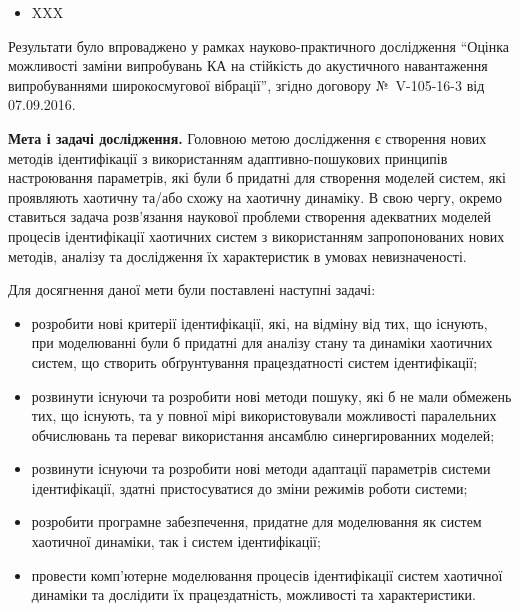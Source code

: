\documentclass[a4paper,12pt]{atuaref}
\begin{document}
\begin{itemize}

\item XXX

\end{itemize}

Результати було впроваджено у рамках науково-практичного дослідження
``Оцінка    можливості заміни випробувань КА на стійкість до акустичного навантаження
випробуваннями широкосмугової вібрації'', згідно договору №~V-105-16-3 від 07.09.2016.

\textbf{Мета і задачі дослідження.}
Головною метою дослідження є створення нових методів ідентифікації з
використанням адаптивно-пошукових принципів настроювання параметрів, які
були б придатні для створення моделей систем, які проявляють хаотичну
та/або схожу на хаотичну динаміку. В свою чергу, окремо ставиться задача
розв'язання наукової проблеми створення адекватних моделей процесів
ідентифікації хаотичних систем з використанням запропонованих нових
методів, аналізу та дослідження їх характеристик в умовах невизначеності.

Для досягнення даної мети були поставлені наступні задачі:

\begin{itemize}

  \item
  розробити нові критерії ідентифікації, які, на відміну від тих, що
  існують, при моделюванні були б придатні для аналізу стану та динаміки
  хаотичних систем, що створить обґрунтування працездатності систем
  ідентифікації;

  \item
  розвинути існуючи та розробити нові методи пошуку, які б не мали
  обмежень тих, що існують, та у повної мірі використовували можливості
  паралельних обчислювань та переваг використання ансамблю
  синергированних моделей;

  \item
  розвинути існуючи та розробити нові методи адаптації параметрів
  системи ідентифікації, здатні пристосуватися до зміни режимів роботи
  системи;

  \item
  розробити програмне забезпечення, придатне для моделювання як систем
  хаотичної динаміки, так і систем ідентифікації;

  \item
  провести комп'ютерне моделювання процесів ідентифікації систем
  хаотичної динаміки та дослідити їх працездатність, можливості та
  характеристики.

\end{itemize}
\end{document}
